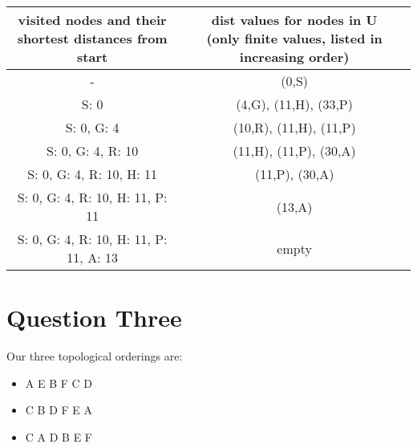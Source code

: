 \documentclass[11pt,letterpaper]{article}
\begin{document}
\begin{table}[h]
	\begin{center}
		\begin{tabular}{|c|c|} \hline
	\shortstack{visited nodes and their \\ shortest distances from start} & \shortstack{dist values for nodes in U \\(only finite values, listed in increasing order)} \\ \hline \hline
	- & (0,S) \\ \hline
	S: 0 & (4,G), (11,H), (33,P) \\ \hline
	S: 0, G: 4 & (10,R), (11,H), (11,P)  \\ \hline
	S: 0, G: 4, R: 10 & (11,H), (11,P), (30,A) \\ \hline
	S: 0, G: 4, R: 10, H: 11 & (11,P), (30,A) \\ \hline
	S: 0, G: 4, R: 10, H: 11, P: 11 & (13,A) \\ \hline
	S: 0, G: 4, R: 10, H: 11, P: 11, A: 13 & empty \\ \hline
		\end{tabular}
	\end{center}
\end{table}


\section{Question Three}
Our three topological orderings are:
\begin{itemize}
	\item A E B F C D
	\item C B D F E A
	\item C A D B E F
\end{itemize}
\end{document}
